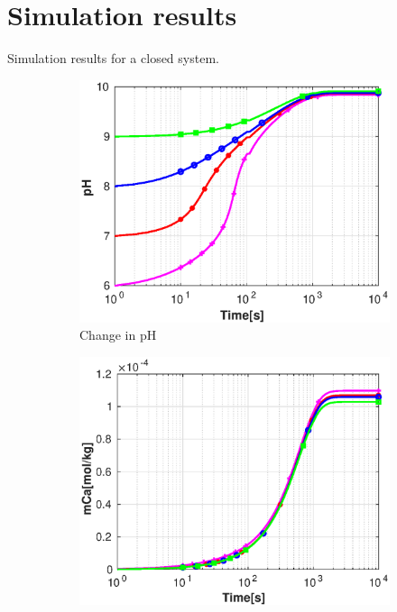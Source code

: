 \section{\MATLAB Simulation results}
\MATLAB Simulation results for a closed system. 

\begin{figure}[!h]
        \centering
    \begin{subfigure}{.5\linewidth}
        \centering
        \includegraphics[width=\textwidth]{PICTURES/without_vel_pH.eps}
        \caption{Change in pH}
        \label{fig:withoutvelpH}       %
    \end{subfigure}%
        \hfill
    \begin{subfigure}{.5\linewidth}
        \centering
        \includegraphics[width=\textwidth]{PICTURES/without_vel_mCa.eps}

\end{subfigure}
\end{figure}
